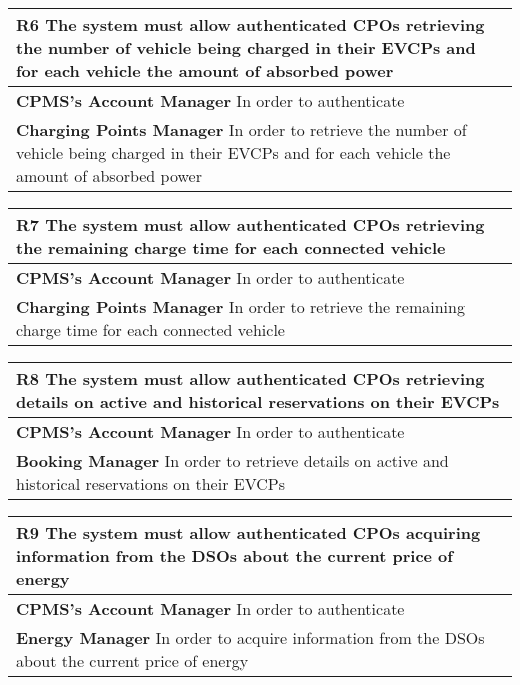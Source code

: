 \begin{table}[H]
    \begin{tabularx}{\textwidth}{X}
        \toprule
        \textbf{R6} The system must allow authenticated CPOs retrieving the number of vehicle
        being charged in their EVCPs and for each vehicle the amount of absorbed
        power \\ \midrule
        \textbf{CPMS's Account Manager} In order to authenticate                                                                                      \\ 
        \textbf{Charging Points Manager} In order to retrieve the number of vehicle being charged in their EVCPs and for each vehicle the amount of absorbed power\\ 
    \end{tabularx}
\end{table}
\begin{table}[H]
    \begin{tabularx}{\textwidth}{X}
        \toprule
        \textbf{R7} The system must allow authenticated CPOs retrieving the remaining charge
        time for each connected vehicle \\ \midrule
        \textbf{CPMS's Account Manager}  In order to authenticate                                                                                     \\
        \textbf{Charging Points Manager}  In order to retrieve the remaining charge time for each connected vehicle\\
    \end{tabularx}
\end{table}
\begin{table}[H]
    \begin{tabularx}{\textwidth}{X}
        \toprule
        \textbf{R8} The system must allow authenticated CPOs retrieving details on active and
        historical reservations on their EVCPs        \\ \midrule
        \textbf{CPMS's Account Manager}  In order to authenticate \\                                                                                    
        \textbf{Booking Manager}  In order to retrieve details on active and historical reservations on their EVCPs\\
    \end{tabularx}
\end{table}
\begin{table}[H]
    \begin{tabularx}{\textwidth}{X}
        \toprule
        \textbf{R9} The system must allow authenticated CPOs acquiring information from the
        DSOs about the current price of energy        \\ \midrule
        \textbf{CPMS's Account Manager}  In order to authenticate\\                                                                                     
        \textbf{Energy Manager} In order to acquire information from the DSOs about the current price of energy \\ 
    \end{tabularx}
\end{table}
